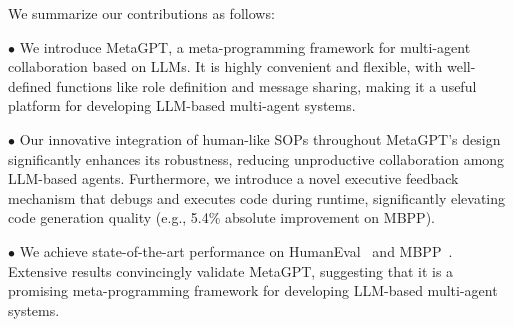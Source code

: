 We summarize our contributions as follows:

\noindent \textbf{$\bullet$} 
We introduce MetaGPT, a meta-programming framework for multi-agent collaboration based on LLMs. It is highly convenient and flexible, with well-defined functions like role definition and message sharing, making it a useful platform for developing LLM-based multi-agent systems. 

\noindent \textbf{$\bullet$} 
Our innovative integration of human-like SOPs throughout MetaGPT's design significantly enhances its robustness, reducing unproductive collaboration among LLM-based agents.
Furthermore, we introduce a novel executive feedback mechanism that debugs and executes code during runtime, significantly elevating code generation quality (e.g., 5.4\% absolute improvement on MBPP).

\noindent \textbf{$\bullet$} 
We achieve state-of-the-art performance on HumanEval~\citep{chen2021evaluating} and MBPP~\citep{austin2021program}. 
Extensive results convincingly validate MetaGPT, suggesting that it is a promising meta-programming framework for developing LLM-based multi-agent systems.